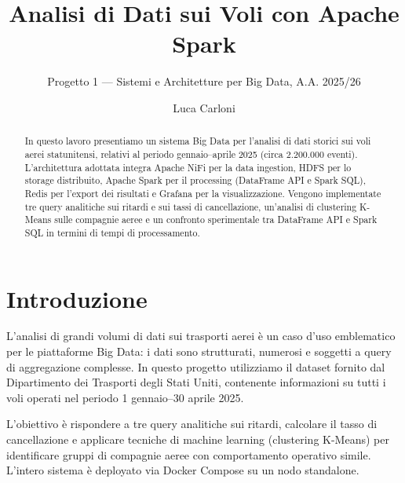 \documentclass[sigconf]{acmart}
\begin{document}
\title{Analisi di Dati sui Voli con Apache Spark}
\subtitle{Progetto 1 — Sistemi e Architetture per Big Data, A.A. 2025/26}

\author{Luca Carloni}


\begin{abstract}
In questo lavoro presentiamo un sistema Big Data per l'analisi di dati storici
sui voli aerei statunitensi, relativi al periodo gennaio--aprile 2025 (circa
2.200.000 eventi). L'architettura adottata integra Apache NiFi per la data
ingestion, HDFS per lo storage distribuito, Apache Spark per il processing
(DataFrame API e Spark SQL), Redis per l'export dei risultati e Grafana per la
visualizzazione. Vengono implementate tre query analitiche sui ritardi e sui
tassi di cancellazione, un'analisi di clustering K-Means sulle compagnie aeree
e un confronto sperimentale tra DataFrame API e Spark SQL in termini di tempi
di processamento.
\end{abstract}

\maketitle

\section{Introduzione}

L'analisi di grandi volumi di dati sui trasporti aerei è un caso d'uso
emblematico per le piattaforme Big Data: i dati sono strutturati, numerosi e
soggetti a query di aggregazione complesse. In questo progetto utilizziamo il
dataset fornito dal Dipartimento dei Trasporti degli Stati Uniti, contenente
informazioni su tutti i voli operati nel periodo 1 gennaio--30 aprile 2025.

L'obiettivo è rispondere a tre query analitiche sui ritardi, calcolare il tasso
di cancellazione e applicare tecniche di machine learning (clustering K-Means)
per identificare gruppi di compagnie aeree con comportamento operativo simile.
L'intero sistema è deployato via Docker Compose su un nodo standalone.
\end{document}
